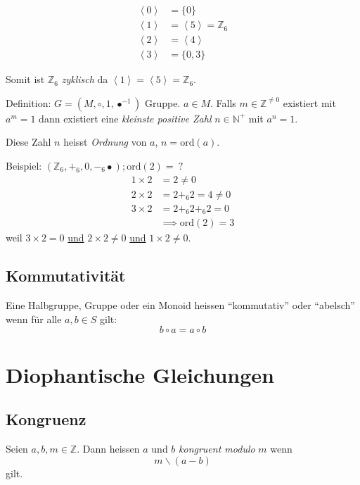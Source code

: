 \documentclass[a4paper, ngerman, landscape, fleqn]{article}
\begin{document}
\begin{multicols*}{3}
\begin{align*}
    \left< 0 \right> &= \{ 0 \} \\
    \left< 1 \right> &= \left< 5 \right> = \mathbb{Z}_6 \\
    \left< 2 \right> &= \left< 4 \right> \\
    \left< 3 \right> &= \{ 0, 3 \}
\end{align*}

Somit ist $\mathbb{Z}_6$ \emph{zyklisch} da $\left< 1 \right> = \left< 5 \right> = \mathbb{Z}_6$.

Definition: $G = (M, \circ, 1, \bullet^{-1})$ Gruppe. $a \in M$.
Falls $m \in \mathbb{Z}^{\neq 0}$ existiert mit $a^m = 1$ dann existiert eine \emph{kleinste positive Zahl} $n \in \mathbb{N}^+$ mit $a^n = 1$. 

Diese Zahl $n$ heisst \emph{Ordnung} von $a$, $n= \mathrm{ord}(a)$.

Beispiel: $(\mathbb{Z}_6, +_6, 0, -_6\bullet); \mathrm{ord}(2)=\ ?$
\begin{align*}
    1 \times 2 &= 2 \neq 0 \\
    2 \times 2 &= 2 +_6 2 = 4 \neq 0 \\
    3 \times 2 &= 2 +_6 2 +_6 2 = 0 \\
               &\implies \mathrm{ord}(2) = 3
\end{align*}
weil $3 \times 2 = 0$ \underline{und} $2 \times 2 \neq 0$ \underline{und} $1 \times 2 \neq 0$.

\subsection*{Kommutativität}
Eine Halbgruppe, Gruppe oder ein Monoid heissen ``kommutativ'' oder ``abelsch'' wenn für alle $a, b \in S$ gilt:
\begin{equation*}
    b \circ a = a \circ b
\end{equation*}

\section*{Diophantische Gleichungen}
\subsection*{Kongruenz}
Seien $a, b, m \in \mathbb{Z}$. Dann heissen $a$ und $b$ \emph{kongruent modulo} $m$ wenn
\begin{equation*}
    m \backslash (a -b)
\end{equation*}
gilt.


\end{multicols*}
\end{document}
